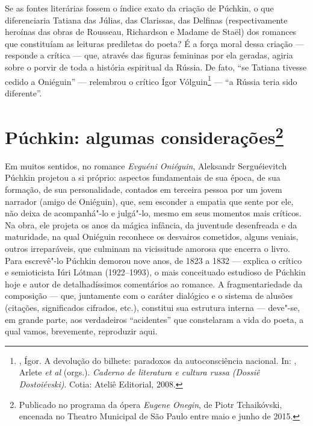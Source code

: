 Se as fontes literárias fossem o índice exato da criação de Púchkin, o
que diferenciaria Tatiana das Júlias, das Clarissas, das Delfinas
(respectivamente heroínas das obras de Rousseau, Richardson e Madame de
Staël) dos romances que constituíam as leituras prediletas do poeta? É a força
moral dessa criação --- responde a crítica --- que, através das figuras
femininas por ela geradas, agiria sobre o porvir de toda a história
espiritual da Rússia. De fato, ``se Tatiana tivesse cedido a Oniéguin'' ---
relembrou o crítico Ígor Vólguin\footnote{, Ígor. A devolução do bilhete: paradoxos da autoconsciência nacional. In: , Arlete \emph{et al} (orgs.). \emph{Caderno de literatura e cultura russa (Dossiê Dostoiévski)}. Cotia: Ateliê Editorial, 2008.} --- ``a Rússia teria sido diferente''.

\chapter{Púchkin: algumas considerações\footnote{Publicado no programa da ópera \emph{Eugene Onegin}, de Piotr Tchaikóvski, encenada no Theatro Municipal de São Paulo entre maio e junho de 2015.}}
\label{onieguin}

Em muitos sentidos, no romance \emph{Evguéni Oniéguin},
Aleksandr Serguéievitch Púchkin
projetou a si próprio: aspectos fundamentais de sua época, de sua
formação, de sua personalidade, contados em terceira pessoa por um jovem
narrador (amigo de Oniéguin), que, sem esconder a empatia que sente por
ele, não deixa de acompanhá"-lo e julgá"-lo, mesmo em seus momentos mais
críticos. Na obra, ele projeta os anos da mágica infância, da juventude
desenfreada e da maturidade, na qual Oniéguin reconhece os desvairos
cometidos, alguns veniais, outros irreparáveis, que culminam na
vicissitude amorosa que encerra o livro. Para escrevê"-lo Púchkin demorou
nove anos, de 1823 a 1832 --- explica o crítico e semioticista Iúri
Lótman (1922--1993), o mais conceituado estudioso de
Púchkin hoje e autor de detalhadíssimos comentários ao romance. A
fragmentariedade da composição --- que, juntamente com o caráter dialógico e
o sistema de alusões (citações, significados cifrados, etc.), constitui
sua estrutura interna --- deve"-se, em grande parte, aos verdadeiros
``acidentes'' que constelaram a vida do poeta, a qual vamos, brevemente,
reproduzir aqui.

